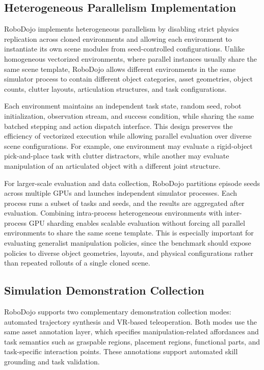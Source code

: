 \subsection{Heterogeneous Parallelism Implementation}
\label{appendix:heterogeneous_parallelism_details}

RoboDojo implements heterogeneous parallelism by disabling strict physics replication across cloned environments and allowing each environment to instantiate its own scene modules from seed-controlled configurations. Unlike homogeneous vectorized environments, where parallel instances usually share the same scene template, RoboDojo allows different environments in the same simulator process to contain different object categories, asset geometries, object counts, clutter layouts, articulation structures, and task configurations.

Each environment maintains an independent task state, random seed, robot initialization, observation stream, and success condition, while sharing the same batched stepping and action dispatch interface. This design preserves the efficiency of vectorized execution while allowing parallel evaluation over diverse scene configurations. For example, one environment may evaluate a rigid-object pick-and-place task with clutter distractors, while another may evaluate manipulation of an articulated object with a different joint structure.

For larger-scale evaluation and data collection, RoboDojo partitions episode seeds across multiple GPUs and launches independent simulator processes. Each process runs a subset of tasks and seeds, and the results are aggregated after evaluation. Combining intra-process heterogeneous environments with inter-process GPU sharding enables scalable evaluation without forcing all parallel environments to share the same scene template. This is especially important for evaluating generalist manipulation policies, since the benchmark should expose policies to diverse object geometries, layouts, and physical configurations rather than repeated rollouts of a single cloned scene.

\subsection{Simulation Demonstration Collection}
\label{appendix:simulation_data_collection_details}

RoboDojo supports two complementary demonstration collection modes: automated trajectory synthesis and VR-based teleoperation. Both modes use the same asset annotation layer, which specifies manipulation-related affordances and task semantics such as graspable regions, placement regions, functional parts, and task-specific interaction points. These annotations support automated skill grounding and task validation.

